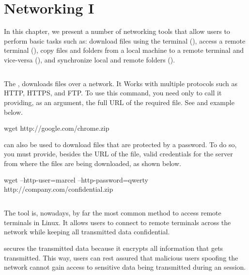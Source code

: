\chapter{Networking I}\label{ch:networking1}

In this chapter, we present a number of networking tools that allow users to perform basic tasks such as: download files using the terminal (), access a remote terminal (), copy files and folders from a local machine to a remote terminal and vice-versa (), and synchronize local and remote folders ().

\section{}

The , downloads files over a network. It Works with multiple protocols such as HTTP, HTTPS, and FTP. To use this command, you need only to call it providing, as an argument, the full \acs{URL} of the required file. See and example below.

\begin{command_line}[make]
wget http://google.com/chrome.zip
\end{command_line}

 can also be used to download files that are protected by a password. To do so, you must provide, besides the \acs{URL} of the file, valid credentials for the server from where the files are being downloaded, as shown below.

\begin{command_line}[make]
wget --http-user=marcel --http-password=qwerty http://company.com/confidential.zip
\end{command_line}

\section{}

The  tool is, nowadays, by far the most common method to access remote terminals in Linux. It allows users to connect to remote terminals across the network while keeping all transmitted data confidential. 

 secures the transmitted data because it encrypts all information that gets transmitted. This way,  users can rest assured that malicious users spoofing the network cannot gain access to sensitive data being transmitted during an  session.

